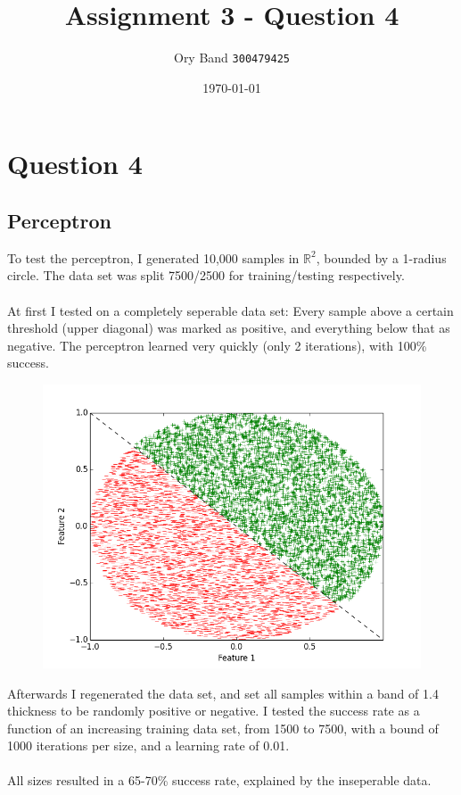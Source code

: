 \documentclass[a4paper]{article}
\title{Assignment 3 - Question 4}
\author{Ory Band \texttt{300479425}}
\date{\today}
\begin{document}
\maketitle
\newpage

\section {Question 4}

\subsection {Perceptron}

To test the perceptron, I generated 10,000 samples in $\mathbb{R}^2$,
bounded by a 1-radius circle.
The data set was split 7500/2500 for training/testing respectively.
\\
\\
At first I tested on a completely seperable data set: Every sample above
a certain threshold (upper diagonal) was marked as positive,
and everything below that as negative.
The perceptron learned very quickly (only 2 iterations), with 100\% success.

\begin{figure}[h!]
    \includegraphics[width=1.0\textwidth]{images/seperable.png}
\end{figure}

\newpage

Afterwards I regenerated the data set, and set all samples within a band of
1.4 thickness to be randomly positive or negative. I tested the success rate
as a function of an increasing training data set, from 1500 to 7500,
with a bound of 1000 iterations per size, and a learning rate of 0.01.
\\
\\
All sizes resulted in a 65-70\% success rate, explained by the inseperable data.
\end{document}
